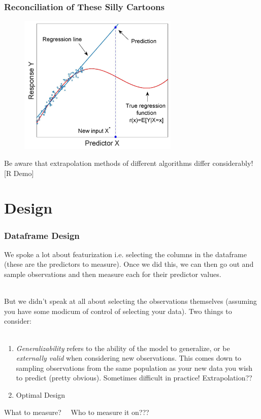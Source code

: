 \documentclass[handout]{beamer}
\begin{document}
\begin{frame}\frametitle{Reconciliation of These Silly Cartoons}

\vspace{-0.3cm} 
\begin{figure}
\centering
\includegraphics[width=3.0in]{extrap.jpg}
\end{figure}
 \pause 
 \small
\vspace{-0.1cm} 
Be aware that extrapolation methods of different algorithms differ considerably! [R Demo]

\end{frame}

\section{Design}

\begin{frame}\frametitle{Dataframe Design}

\small

We spoke a lot about featurization i.e. selecting the columns in the dataframe (these are the predictors to measure). Once we did this, we can then go out and sample observations and then measure each for their predictor values. \\~\\ \pause

But we didn't speak at all about selecting the observations themselves (assuming you have some modicum of control of selecting your data). Two things to consider: \\~\\  \pause

\begin{enumerate}
\item \emph{Generalizability} refers to the ability of the model to generalize, or be \emph{externally valid} when considering new observations. This comes down to sampling observations from the same population as your new data you wish to predict (pretty obvious). Sometimes difficult in practice! \pause Extrapolation?? \pause 
\item Optimal Design \pause
\end{enumerate}

What to measure? \checkmark ~~\pause Who to measure it on???	
\end{frame}
\end{document}
